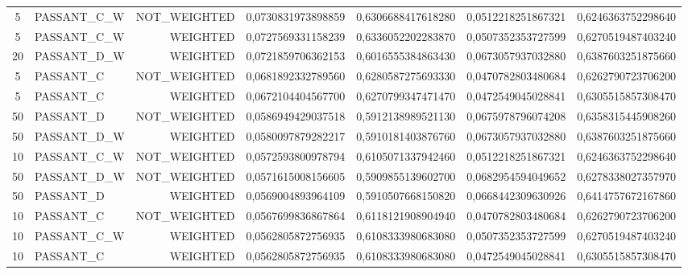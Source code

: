 \begin{table}[H]
{\begin{tabular}{ c l r c c c c }
	5 & PASSANT\_C\_W & NOT\_WEIGHTED & 0,0730831973898859 & 0,6306688417618280 & 0,0512218251867321 & 0,6246363752298640 \\
	
	5 & PASSANT\_C\_W &   WEIGHTED & 0,0727569331158239 & 0,6336052202283870 & 0,0507352353727599 & 0,6270519487403240 \\
	
	20 & PASSANT\_D\_W &   WEIGHTED & 0,0721859706362153 & 0,6016555384863430 & 0,0673057937032880 & 0,6387603251875660 \\
	
	5 &  PASSANT\_C & NOT\_WEIGHTED & 0,0681892332789560 & 0,6280587275693330 & 0,0470782803480684 & 0,6262790723706200 \\
	
	5 &  PASSANT\_C &   WEIGHTED & 0,0672104404567700 & 0,6270799347471470 & 0,0472549045028841 & 0,6305515857308470 \\
	
	50 &  PASSANT\_D & NOT\_WEIGHTED & 0,0586949429037518 & 0,5912138989521130 & 0,0675978796074208 & 0,6358315445908260 \\
	
	50 & PASSANT\_D\_W &   WEIGHTED & 0,0580097879282217 & 0,5910181403876760 & 0,0673057937032880 & 0,6387603251875660 \\
	
	10 & PASSANT\_C\_W & NOT\_WEIGHTED & 0,0572593800978794 & 0,6105071337942460 & 0,0512218251867321 & 0,6246363752298640 \\
	
	50 & PASSANT\_D\_W & NOT\_WEIGHTED & 0,0571615008156605 & 0,5909855139602700 & 0,0682954594049652 & 0,6278338027357970 \\
	
	50 &  PASSANT\_D &   WEIGHTED & 0,0569004893964109 & 0,5910507668150820 & 0,0668442309630926 & 0,6414757672167860 \\
	
	10 &  PASSANT\_C & NOT\_WEIGHTED & 0,0567699836867864 & 0,6118121908904940 & 0,0470782803480684 & 0,6262790723706200 \\
	
	10 & PASSANT\_C\_W &   WEIGHTED & 0,0562805872756935 & 0,6108333980683080 & 0,0507352353727599 & 0,6270519487403240 \\
	
	10 &  PASSANT\_C &   WEIGHTED & 0,0562805872756935 & 0,6108333980683080 & 0,0472549045028841 & 0,6305515857308470 \\
	

\end{tabular}}
\end{table}
